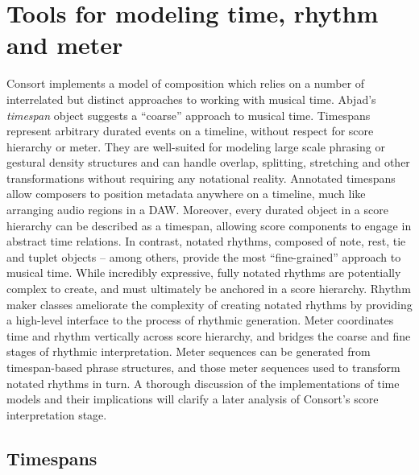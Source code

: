 \chapter{Tools for modeling time, rhythm and meter}

\begin{comment}
<abjad>[hide=true]
import consort
</abjad>
\end{comment}

Consort implements a model of composition which relies on a number of
interrelated but distinct approaches to working with musical time. Abjad's
\emph{timespan} object suggests a \enquote{coarse} approach to musical time.
Timespans represent arbitrary durated events on a timeline, without respect for
score hierarchy or meter. They are well-suited for modeling large scale
phrasing or gestural density structures and can handle overlap, splitting,
stretching and other transformations without requiring any notational reality.
Annotated timespans allow composers to position metadata anywhere on a
timeline, much like arranging audio regions in a DAW. Moreover, every durated
object in a score hierarchy can be described as a timespan, allowing score
components to engage in abstract time relations. In contrast, notated rhythms,
composed of note, rest, tie and tuplet objects -- among others, provide the
most \enquote{fine-grained} approach to musical time. While incredibly
expressive, fully notated rhythms are potentially complex to create, and must
ultimately be anchored in a score hierarchy. Rhythm maker classes ameliorate
the complexity of creating notated rhythms by providing a high-level interface
to the process of rhythmic generation. Meter coordinates time and rhythm
vertically across score hierarchy, and bridges the coarse and fine stages of
rhythmic interpretation. Meter sequences can be generated from timespan-based
phrase structures, and those meter sequences used to transform notated rhythms
in turn. A thorough discussion of the implementations of time models and their
implications will clarify a later analysis of Consort's score interpretation
stage.

\section{Timespans}

